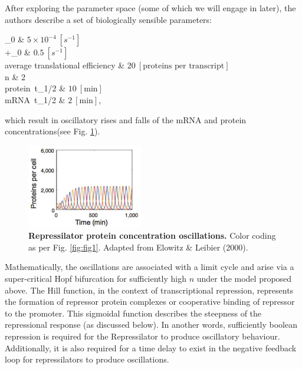 \documentclass[runningheads,a4paper]{llncs}
\makeatletter
\newenvironment{conditions}
  {\par\setlength{\leftskip}{1cm}\vspace{\abovedisplayskip}\noindent
   \tabularx{0.9\columnwidth}{>{$}l<{$} @{${}\ =\ {}$} >{\raggedright\arraybackslash}X}}
  {\endtabularx\par\setlength{\leftskip}{1cm}\vspace{\belowdisplayskip}}
\makeatother
\begin{document}
After exploring the parameter space (some of which we will engage in later), the authors describe a set of biologically sensible parameters:

\begin{conditions}
    \alpha_{0}                                  &   $5\times 10^{-4}\ [s^{-1}]$  \\
    \alpha+\alpha_{0}                           &   $0.5\ [s^{-1}]$    \\
    \textrm{average translational efficiency}   &   $20\ [\textrm{proteins per transcript}]$  \\
    n                                           &   $2$   \\
    \textrm{protein}\ t_{1/2}                   &   $10\ [\textrm{min}]$    \\
    \textrm{mRNA}\ t_{1/2}                      &   $2\ [\textrm{min}]$, \\
\end{conditions}

\noindent which result in oscillatory rises and falls of the mRNA and protein concentrations\linebreak (see Fig. \ref{fig:fig2})\cite{Elowitz2000d}.

\begin{figure}
    \singlespacing
    \centering
    \includegraphics[width=0.45\textwidth]{fig/original_oscilations.png}
    \caption{\textbf{Repressilator protein concentration oscillations.} Color coding as per Fig. \ref{fig:fig1}. Adapted from Elowitz \& Leibier (2000)\cite{Elowitz2000d}.}
    \label{fig:fig2}
\end{figure}

Mathematically, the oscillations are associated with a limit cycle and arise via a super-critical Hopf bifurcation for sufficiently high $n$ under the model proposed above\cite{Purcell2010a, Muller2006, Elowitz2000d}. The Hill function, in the context of transcriptional repression, represents the formation of repressor protein complexes or cooperative binding of repressor to the promoter\cite{Gonze2013a}. This sigmoidal function describes the steepness of the repressional response (as discussed below). In another words, sufficiently boolean repression is required for the Repressilator to produce oscillatory behaviour\cite{Purcell2010a}. Additionally, it is also required for a time delay to exist in the negative feedback loop for repressilators to produce oscillations\cite{Purcell2010a,Gonze2020}.
\end{document}
